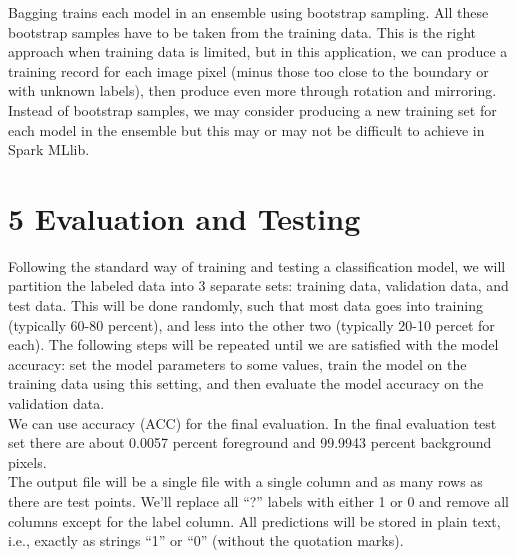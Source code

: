 \documentclass{neu_handout}
\begin{document}
Bagging trains each model in an ensemble using bootstrap sampling. All these bootstrap
samples have to be taken from the training data. This is the right approach when training data is limited, but in this application, we can produce a training record for each image pixel (minus those too close to the
boundary or with unknown labels), then produce even more through rotation and mirroring. Instead of bootstrap samples, we may consider producing a new training set for each model in the ensemble but this may or may not be difficult to achieve in Spark MLlib.

\section*{5 Evaluation and Testing}
Following the standard way of training and testing a classification model, we will partition the labeled data into 3 separate sets: training data, validation data, and test data. This will be done randomly, such that most data goes into training (typically 60-80 percent), and less into the
other two (typically 20-10 percet for each). The following steps will be repeated until we are satisfied with the model accuracy: set the model parameters to some values, train the model on the training data using this setting, and then evaluate the model accuracy on the validation data.\\

We can use accuracy (ACC) for the final evaluation. In the final evaluation test set there are about 0.0057 percent foreground and 99.9943 percent background pixels.\\

The output file will be a single file with a single column and as many rows as there are test points. We'll replace all “?” labels with either 1 or 0 and remove all columns except for the label column. All predictions will be stored in plain text, i.e., exactly as strings “1” or “0” (without the quotation marks).
\end{document}
